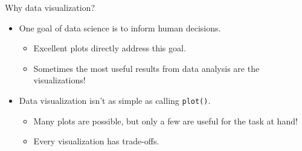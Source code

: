 \documentclass[aspectratio=169]{../latex_main/tntbeamer}  %
\begin{document}
	\begin{frame}[c]{Why data visualization?}
	    \begin{itemize}
	        \item One goal of data science is to inform human decisions.
	        \begin{itemize}
	            \item Excellent plots directly address this goal.
	            \item Sometimes the most useful results from data analysis are the visualizations!
	        \end{itemize}
	        \item Data visualization isn’t as simple as calling \texttt{plot()}.
	        \begin{itemize}
	            \item Many plots are possible, but only a few are useful for the task at hand!
	            \item Every visualization has trade-offs.
	        \end{itemize}
	    \end{itemize}
	\end{frame}
	
\end{document}

